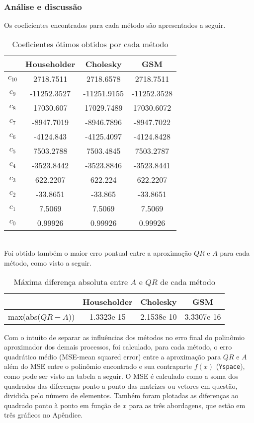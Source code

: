 \documentclass[a4paper, 12pt]{article}
\begin{document}
\subsubsection{Análise e discussão}
Os coeficientes encontrados para cada método são apresentados a seguir.
\begin{table}[h]
\centering
\caption{\label{tab:coef} Coeficientes ótimos obtidos por cada método}
\begin{tabular}{|c||c|c|c|}
\hline&Householder&Cholesky&GSM\\
\hline \hline$c_{10}$&2718.7511&2718.6578&2718.7511\\
\hline$c_9$&-11252.3527&-11251.9155&-11252.3528\\
\hline$c_8$&17030.607&17029.7489&17030.6072\\
\hline$c_7$&-8947.7019&-8946.7896&-8947.7022\\
\hline$c_6$&-4124.843&-4125.4097&-4124.8428\\
\hline$c_5$&7503.2788&7503.4845&7503.2787\\
\hline$c_4$&-3523.8442&-3523.8846&-3523.8441\\
\hline$c_3$&622.2207&622.224&622.2207\\
\hline$c_2$&-33.8651&-33.865&-33.8651\\
\hline$c_1$&7.5069&7.5069&7.5069\\
\hline$c_0$&0.99926&0.99926&0.99926\\ \hline
\end{tabular}
\end{table}
\\
Foi obtido também o maior erro pontual entre a aproximação $QR$ e $A$ para cada método, como visto a seguir.
\begin{table}[H]
\centering
\caption{\label{tab:maxdif} Máxima diferença absoluta entre $A$ e $QR$ de cada método}
\begin{tabular}{|c||c|c|c|}
\hline&Householder&Cholesky&GSM\\
\hline \hline max(abs($QR-A$))&1.3323e-15& 2.1538e-10& 3.3307e-16\\ \hline 
\end{tabular}
\end{table}
Com o intuito de separar as influências dos métodos no erro final do polinômio aproximador dos demais processos, foi calculado, para cada método, o erro quadrático médio (MSE-mean squared error) entre a aproximação para $QR$ e $A$ além do MSE entre o polinômio encontrado e sua contraparte $f(x)$ (\verb+Yspace+), como pode ser visto na tabela a seguir. O MSE é calculado como a soma dos quadrados das diferenças ponto a ponto das matrizes ou vetores em questão, dividida pelo número de elementos. Também foram plotadas as diferenças ao quadrado ponto à ponto em função de $x$ para as três abordagens, que estão em três gráficos no Apêndice.
\end{document}
